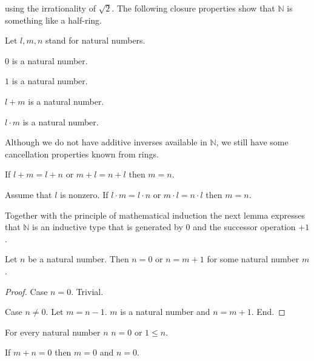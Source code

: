 \documentclass{article}
\begin{document}
using the irrationality of $\sqrt{2}$. 
The following closure
properties show that $\mathbb{N}$ is something like
a half-ring.
\begin{forthel}

Let $l,m,n$ stand for natural numbers.

\begin{lemma}
$0$ is a natural number.
\end{lemma}

\begin{lemma}
$1$ is a natural number.
\end{lemma}

\begin{lemma}
$l + m$ is a natural number.
\end{lemma}

\begin{lemma}
$l \cdot m$ is a natural number.
\end{lemma}
\end{forthel}
Although we do not have additive inverses available in 
$\mathbb{N}$, we still have some cancellation properties
known from rings.
\begin{forthel}
\begin{lemma}
If $l + m = l + n$ or $m + l = n + l$ then $m = n$.
\end{lemma}

\begin{lemma}
Assume that $l$ is nonzero.
If $l \cdot m = l \cdot n$ or $m \cdot l = n \cdot l$ then $m = n$.
\end{lemma}
\end{forthel}
%
Together with the principle of mathematical induction the next
lemma expresses that $\mathbb{N}$ is an inductive type that
is generated by $0$ and the successor operation $+1$. 
%
\begin{forthel}
\begin{lemma} Let $n$ be a natural number. Then
$n = 0$ or $n = m + 1$ for some natural number $m$.
\end{lemma}
\begin{proof}
Case $n = 0$. Trivial.

Case $n \neq 0$. Let $m = n - 1$. $m$ is a natural number and
$n = m + 1$. End.
\end{proof}

\begin{lemma}
For every natural number $n$ $n = 0$ or $1 \leq n$.
\end{lemma}

\begin{lemma}
If $m + n = 0$ then $m = 0$ and $n = 0$.
\end{lemma}
\end{forthel}
\end{document}
